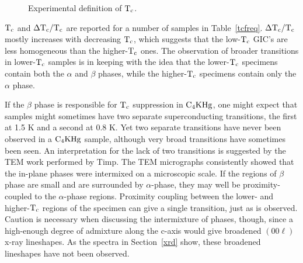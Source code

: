 \begin{figure}
\vspace{12cm}
\caption[Experimental definition of $\rm T_c$.]{Experimental definition of
$\rm T_c$.}
\label{tcdef}
\end{figure}

        $\rm T_c$ and  $\rm  \Delta T_c/T_c$ are  reported for a  number of
samples in Table~\ref{tcfreq}.   $\rm \Delta  T_c/T_c$ mostly  increases
with decreasing $\rm T_c$, which suggests  that the low-$\rm T_c$ GIC's are
less  homogeneous than  the higher-$\rm  T_c$  ones.   The  observation  of
broader transitions in  lower-$\rm T_c$ samples  is in keeping with the idea
that the lower-$\rm T_c$ specimens  contain  both the $\alpha$  and $\beta$
phases, while the higher-$\rm  T_c$ specimens contain  only the $\alpha$ phase.

          If the $\beta$ phase is responsible for  $\rm T_c$ suppression in
$\rm  C_4KHg$,  one might expect  that  samples  might  sometimes  have two
separate  superconducting transitions, the first  at 1.5 K  and a second at
0.8 K.   Yet two separate transitions  have never  been observed in  a $\rm
C_4KHg$ sample, although very broad  transitions have sometimes been  seen.
An interpretation for the lack of  two  transitions is suggested by the TEM
work performed by Timp\cite{K167}.  The TEM micrographs consistently showed
that  the in-plane phases were  intermixed on a  microscopic scale.  If the
regions  of $\beta$ phase are  small  and are surrounded by $\alpha$-phase,
they  may   well  be  proximity-coupled to    the   $\alpha$-phase regions.
Proximity coupling between the  lower- and higher-$\rm  T_c$ regions of the
specimen can give  a single transition, just  as  is observed.  Caution  is
necessary  when discussing the   intermixture   of phases,  though, since a
high-enough degree of admixture   along  the  c-axis would give   broadened
$(00\ell)$   x-ray   lineshapes.\cite{hendricks42}   As  the    spectra  in
Section~\ref{xrd} show, these broadened lineshapes have not been observed.
        
